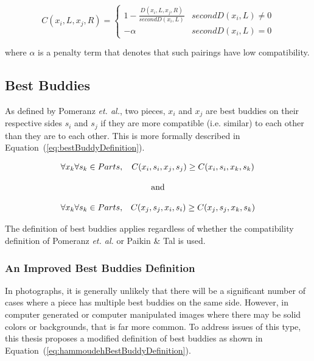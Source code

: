\documentclass{report}
\def\eref#1{(\ref{#1})}
\begin{document}
\begin{equation} \label{eq:hammoudehAsymCompatibility}
C(x_i,L,x_j,R)= \begin{cases} 
	1 - \frac{D(x_i,L,x_j,R)}{secondD(x_i,L)} & secondD(x_i,L) \ne 0
\\
	-\alpha & secondD(x_i,L) = 0
\end{cases} 
\end{equation}

\noindent
where $\alpha$ is a penalty term that denotes that such pairings have low compatibility.


\subsection{Best Buddies}\label{sec:bestBuddies}

As defined by Pomeranz \textit{et. al.}, two pieces, $x_i$ and $x_j$ are best buddies on their respective sides $s_i$ and $s_j$ if they are more compatible (i.e. similar) to each other than they are to each other.  This is more formally described in Equation~\eref{eq:bestBuddyDefinition}.

\begin{equation} \label{eq:bestBuddyDefinition}
\begin{split}
\begin{matrix}
\forall{x_k} \forall{s_k} \in Parts, & C(x_i, s_i, x_j, s_j) \geq C(x_i, s_i, x_k, s_k)
\\
\\
\multicolumn{2}{c}{\textnormal{and}}
\\
\\
\forall{x_k} \forall{s_k} \in Parts, & C(x_j, s_j, x_i, s_i) \geq C(x_j, s_j, x_k, s_k)
\end{matrix}
\end{split}
\end{equation}

The definition of best buddies applies regardless of whether the compatibility definition of Pomeranz \textit{et. al.} or Paikin \& Tal is used.

\subsubsection{An Improved Best Buddies Definition}\label{sec:bestBuddiesLimitations}

In photographs, it is generally unlikely that there will be a significant number of cases where a piece has multiple best buddies on the same side.  However, in computer generated or computer manipulated images where there may be solid colors or backgrounds, that is far more common.  To address issues of this type, this thesis proposes a modified definition of best buddies as shown in Equation~\eref{eq:hammoudehBestBuddyDefinition}.
\end{document}

